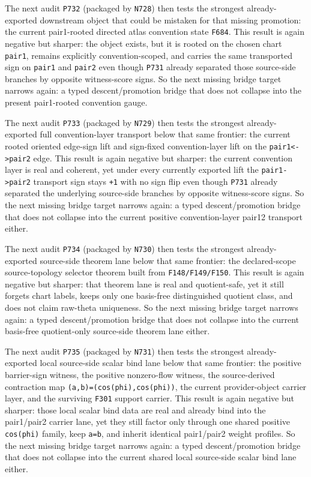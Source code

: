 \documentclass[11pt,a4paper]{article}
\begin{document}
The next audit \texttt{P732} (packaged by \texttt{N728}) then tests the strongest already-exported downstream object
that could be mistaken for that missing promotion: the current pair1-rooted directed atlas convention state \texttt{F684}.
This result is again negative but sharper:
the object exists, but it is rooted on the chosen chart \texttt{pair1}, remains explicitly convention-scoped,
and carries the same transported sign on \texttt{pair1} and \texttt{pair2} even though \texttt{P731} already separated those
source-side branches by opposite witness-score signs.
So the next missing bridge target narrows again:
a typed descent/promotion bridge that does not collapse into the present pair1-rooted convention gauge.

The next audit \texttt{P733} (packaged by \texttt{N729}) then tests the strongest already-exported full convention-layer transport
below that same frontier: the current rooted oriented edge-sign lift and sign-fixed convention-layer lift on the \texttt{pair1<->pair2} edge.
This result is again negative but sharper:
the current convention layer is real and coherent, yet under every currently exported lift the \texttt{pair1->pair2} transport sign stays \texttt{+1}
with no sign flip even though \texttt{P731} already separated the underlying source-side branches by opposite witness-score signs.
So the next missing bridge target narrows again:
a typed descent/promotion bridge that does not collapse into the current positive convention-layer pair12 transport either.

The next audit \texttt{P734} (packaged by \texttt{N730}) then tests the strongest already-exported source-side theorem lane
below that same frontier: the declared-scope source-topology selector theorem built from \texttt{F148/F149/F150}.
This result is again negative but sharper:
that theorem lane is real and quotient-safe, yet it still forgets chart labels, keeps only one basis-free distinguished quotient class,
and does not claim raw-theta uniqueness.
So the next missing bridge target narrows again:
a typed descent/promotion bridge that does not collapse into the current basis-free quotient-only source-side theorem lane either.

The next audit \texttt{P735} (packaged by \texttt{N731}) then tests the strongest already-exported local source-side scalar bind lane
below that same frontier: the positive barrier-sign witness, the positive nonzero-flow witness, the source-derived contraction map
\texttt{(a,b)=(cos(phi),cos(phi))}, the current provider-object carrier layer, and the surviving \texttt{F301} support carrier.
This result is again negative but sharper:
those local scalar bind data are real and already bind into the pair1/pair2 carrier lane,
yet they still factor only through one shared positive \texttt{cos(phi)} family, keep \texttt{a=b},
and inherit identical pair1/pair2 weight profiles.
So the next missing bridge target narrows again:
a typed descent/promotion bridge that does not collapse into the current shared local source-side scalar bind lane either.
\end{document}
